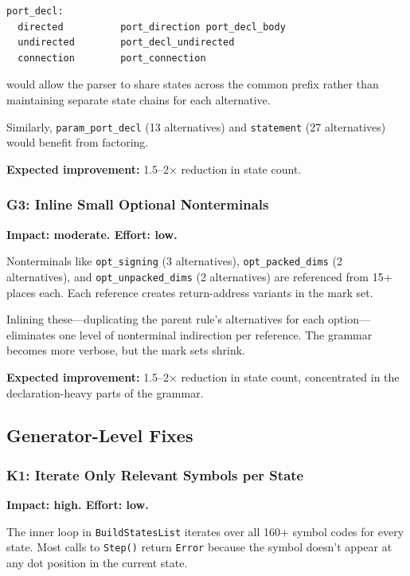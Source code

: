 \documentclass[11pt]{article}
\begin{document}
\begin{lstlisting}[language={}]
port_decl:
  directed          port_direction port_decl_body
  undirected        port_decl_undirected
  connection        port_connection
\end{lstlisting}

would allow the parser to share states across the common prefix
rather than maintaining separate state chains for each alternative.

Similarly, \texttt{param\_port\_decl} (13 alternatives) and
\texttt{statement} (27 alternatives) would benefit from factoring.

\textbf{Expected improvement:} 1.5--2$\times$ reduction in state count.

\subsubsection{G3: Inline Small Optional Nonterminals}

\textbf{Impact: moderate. \quad Effort: low.}

Nonterminals like \texttt{opt\_signing} (3 alternatives),
\texttt{opt\_packed\_dims} (2 alternatives), and
\texttt{opt\_unpacked\_dims} (2 alternatives) are referenced from
15+ places each.  Each reference creates return-address variants in the
mark set.

Inlining these---duplicating the parent rule's alternatives for each
option---eliminates one level of nonterminal indirection per reference.
The grammar becomes more verbose, but the mark sets shrink.

\textbf{Expected improvement:} 1.5--2$\times$ reduction in state count,
concentrated in the declaration-heavy parts of the grammar.

\subsection{Generator-Level Fixes}

\subsubsection{K1: Iterate Only Relevant Symbols per State}

\textbf{Impact: high. \quad Effort: low.}

The inner loop in \texttt{BuildStatesList} iterates over all 160+
symbol codes for every state.  Most calls to \texttt{Step()} return
\texttt{Error} because the symbol doesn't appear at any dot position
in the current state.
\end{document}
